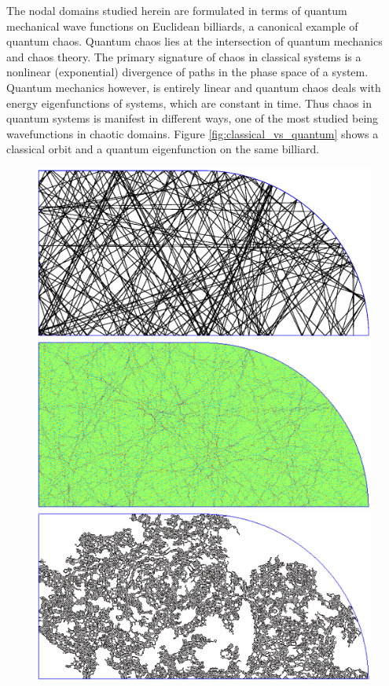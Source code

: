 \documentclass{report}
\begin{document}
The nodal domains studied herein are formulated in terms of quantum mechanical wave functions on Euclidean billiards, a canonical example of quantum chaos. Quantum chaos lies at the intersection of quantum mechanics and chaos theory. The primary signature of chaos in classical systems is a nonlinear (exponential) divergence of paths in the phase space of a system. Quantum mechanics however, is entirely linear and quantum chaos deals with energy eigenfunctions of systems, which are constant in time. Thus chaos in quantum systems is manifest in different ways, one of the most studied being wavefunctions in chaotic domains. Figure \ref{fig:classical_vs_quantum} shows a classical orbit and a quantum eigenfunction on the same billiard.

\begin{figure}
  \begin{center}
    \includegraphics[width=\textwidth]{figs/classical/stadium_orbit.eps}
    \linebreak
    \includegraphics[width=\textwidth]{figs/classical/stadium_eigenfunction.eps}
    \linebreak
    \includegraphics[width=\textwidth]{figs/classical/stadium_eigenfunction_largest_nodal_domain.eps}

\end{center}
\end{figure}
\end{document}
